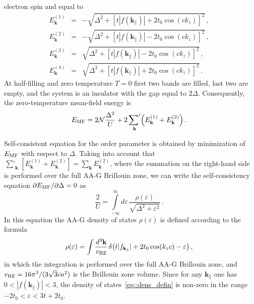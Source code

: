 \documentclass[prb,twocolumn,showpacs,aps,superscriptaddress,floatfix]{revtex4}
\begin{document}
electron spin and equal to
\begin{eqnarray}
E_\mathbf{k}^{(1)}&=&-\sqrt{\Delta^2+\left[t|f(\mathbf{k}_{\|})|+2t_0\cos(c k_z)\right]^2}\,,\label{eq::MF_band1}\\
E_\mathbf{k}^{(2)}&=&-\sqrt{\Delta^2+\left[t|f(\mathbf{k}_{\|})|-2t_0\cos(c k_z)\right]^2}\,,\label{eq::MF_band2}\\
E_\mathbf{k}^{(3)}&=&\sqrt{\Delta^2+\left[t|f(\mathbf{k}_{\|})|-2t_0\cos(c k_z)\right]^2}\,,\label{eq::MF_band3}\\
E_\mathbf{k}^{(4)}&=&\sqrt{\Delta^2+\left[t|f(\mathbf{k}_{\|})|+2t_0\cos(c k_z)\right]^2}\,.\label{eq::MF_band4}
\end{eqnarray}
At half-filling and zero temperature
$T=0$
first two bands are filled, last two are empty, and the system is an
insulator with the gap equal to $2\Delta$. Consequently, the
zero-temperature mean-field energy is
\begin{eqnarray}
E_{\rm MF}=2{\cal{N}}\frac{\Delta^2}{U}+2\mathop{{\sum}'}_{\mathbf{k}}\!\left(E_\mathbf{k}^{(1)}+E_\mathbf{k}^{(2)}\right).
\end{eqnarray}

Self-consistent equation for the order parameter is obtained by
minimization of
$E_{\rm MF}$
with respect to $\Delta$. Taking into account that
$\mathop{{\sum}'}_{\mathbf{k}}
[E_\mathbf{k}^{(1)}
+
E_\mathbf{k}^{(2)}]
\!=\!
\sum_{\mathbf{k}}\!E_\mathbf{k}^{(2)}$,
where the summation on the right-hand side is performed over the full AA-G
Brillouin zone, we can write the self-consistency equation
$\partial E_{\rm MF}/\partial\Delta=0$
as
\begin{equation}
\label{eq::diff_E_MF}
\frac{2}{U}
=
\int\limits_{-\infty}^{\infty}\!\!
	d\varepsilon\,
	\frac{\rho (\varepsilon) }{\sqrt{\Delta^2+\varepsilon^2}}\,.
\end{equation}
In this equation the AA-G density of states
$\rho(\varepsilon)$
is defined according to the formula
\begin{equation}
\label{eq::dens_defin}
\rho (\varepsilon)
=
\int\frac{d^3{\bf k}}{v_{\rm BZ}}\,
	\delta\!\left(
			t|f_{\mathbf{k}_{\|}}|
			+
			2t_0 \cos (k_zc)
			-
			\varepsilon
		\right),
\end{equation}
in which the integration is performed over the full AA-G Brillouin zone,
and
$v_{\rm BZ}=16\pi^3/(3\sqrt{3}c a^2)$
is the Brillouin zone volume. Since for any
$\mathbf{k}_{\|}$
one has
$0< |f({\mathbf{k}_{\|}})| < 3$,
the density of
states~\eqref{eq::dens_defin}
is non-zero in the range
$-2t_0<\varepsilon<3t+2t_0$.
\end{document}
